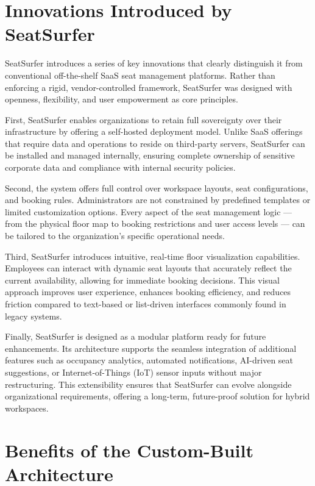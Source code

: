 \documentclass[12pt,a4paper]{report} %
\begin{document}
\section{Innovations Introduced by SeatSurfer}

SeatSurfer introduces a series of key innovations that clearly distinguish it from conventional off-the-shelf SaaS seat management platforms. Rather than enforcing a rigid, vendor-controlled framework, SeatSurfer was designed with openness, flexibility, and user empowerment as core principles.

First, SeatSurfer enables organizations to retain full sovereignty over their infrastructure by offering a self-hosted deployment model. Unlike SaaS offerings that require data and operations to reside on third-party servers, SeatSurfer can be installed and managed internally, ensuring complete ownership of sensitive corporate data and compliance with internal security policies.

Second, the system offers full control over workspace layouts, seat configurations, and booking rules. Administrators are not constrained by predefined templates or limited customization options. Every aspect of the seat management logic — from the physical floor map to booking restrictions and user access levels — can be tailored to the organization's specific operational needs.

Third, SeatSurfer introduces intuitive, real-time floor visualization capabilities. Employees can interact with dynamic seat layouts that accurately reflect the current availability, allowing for immediate booking decisions. This visual approach improves user experience, enhances booking efficiency, and reduces friction compared to text-based or list-driven interfaces commonly found in legacy systems.

Finally, SeatSurfer is designed as a modular platform ready for future enhancements. Its architecture supports the seamless integration of additional features such as occupancy analytics, automated notifications, AI-driven seat suggestions, or Internet-of-Things (IoT) sensor inputs without major restructuring. This extensibility ensures that SeatSurfer can evolve alongside organizational requirements, offering a long-term, future-proof solution for hybrid workspaces.

\section{Benefits of the Custom-Built Architecture}
\end{document}
